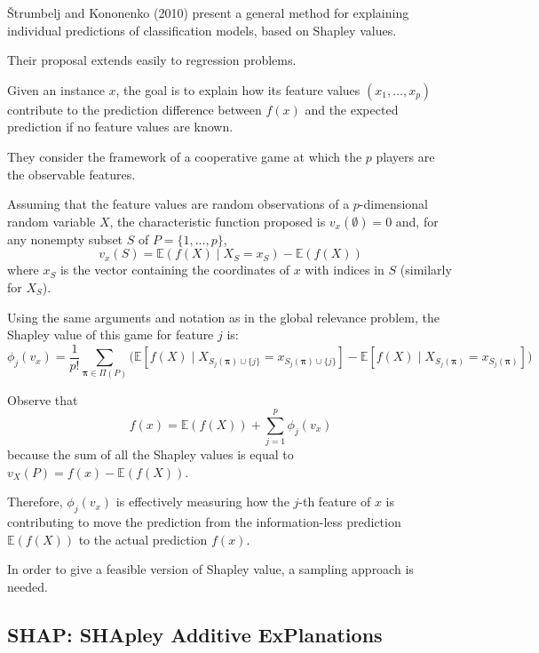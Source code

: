 Štrumbelj and Kononenko (2010) present a general method for
explaining individual predictions of classification models, based on
Shapley values.

Their proposal extends easily to regression problems.

Given an instance $x$, the goal is to explain how its feature values
$(x_1,\ldots,x_p)$ contribute to the prediction difference between $f(x)$ and
the expected prediction if no feature values are known.

They consider the framework of a
cooperative game at which the $p$ players are the observable features.

Assuming that the feature values are random observations of a
$p$-dimensional random variable $X$, the characteristic function
proposed is $v_x (\emptyset) = 0$ and, for
any nonempty subset $S$ of $P = \{1,\ldots,p\}$,
\begin{equation*}
	v_x(S) = \mathds E (f (X) \mid X_S = x_S) − \mathds E (f (X))
\end{equation*}
where $x_S$ is the vector containing the coordinates of $x$ with indices
in $S$ (similarly for $X_S$).

Using the same arguments and notation as in the global relevance
problem, the Shapley value of this game for feature $j$ is:
\begin{equation*}
	\phi_j(v_x) = \frac{1}{p!} \sum_{\boldsymbol \pi \in \Pi(P)} \biggl(
	\mathds E \left[
			f(X) \mid X_{S_j(\boldsymbol \pi) \cup \{j\}} = x_{S_j(\boldsymbol \pi) \cup \{j\}}
			\right]
	- \mathds E \left[
			f(X) \mid X_{S_j(\boldsymbol \pi)} = x_{S_j(\boldsymbol \pi)}
			\right]
	\biggr)
\end{equation*}

Observe that
\begin{equation*}
	f(x) = \mathds E(f(X)) + \sum_{j = 1}^p \phi_j(v_x)
\end{equation*}
because the sum of all the Shapley values is equal to
$v_X(P) = f(x) - \mathds E(f(X))$.

Therefore, $\phi_j(v_x)$ is effectively measuring how the $j$-th feature of $x$ is
contributing to move the prediction from the information-less prediction
$\mathds E(f(X))$ to the actual prediction $f(x)$.

In order to give a feasible version of Shapley value, a sampling approach is needed.

\subsection{SHAP: SHApley Additive ExPlanations}

